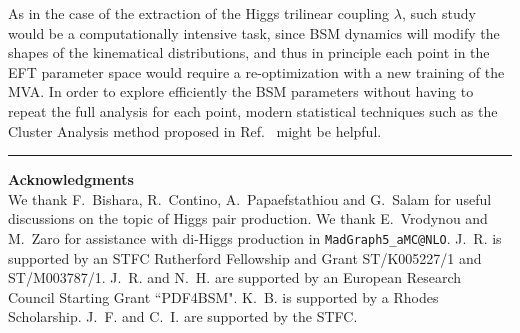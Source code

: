 As in the case of the extraction of the Higgs
trilinear coupling $\lambda$, such study
would be a computationally intensive task, since
BSM dynamics will modify the shapes of the kinematical
distributions, and thus in principle each point in the EFT parameter
space would require a re-optimization with a new training
of the MVA.
%
In order to explore efficiently the BSM parameters
without having to repeat the full analysis
for each point, modern statistical techniques
such as the Cluster Analysis method proposed
in Ref.~\cite{Dall'Osso:2015aia} might be helpful.



\bigskip
\bigskip
\begin{center}
\rule{5cm}{.1pt}
\end{center}
\bigskip
\bigskip

{\bf\noindent  Acknowledgments \\}
We thank F.~Bishara, R.~Contino, A.~Papaefstathiou and
G.~Salam for useful discussions on the topic
of Higgs pair production.
%
We thank E.~Vrodynou and M.~Zaro for
assistance with di-Higgs production
  in {\tt MadGraph5\_aMC@NLO}.
%
  J.~R. is supported by an STFC Rutherford Fellowship and
  Grant ST/K005227/1 and ST/M003787/1.
%
J.~R. and N.~H. are
supported by an European Research Council Starting Grant ``PDF4BSM".
%
K.~B. is supported by a Rhodes Scholarship.
%
J.~F. and C.~I. are supported by the STFC.
